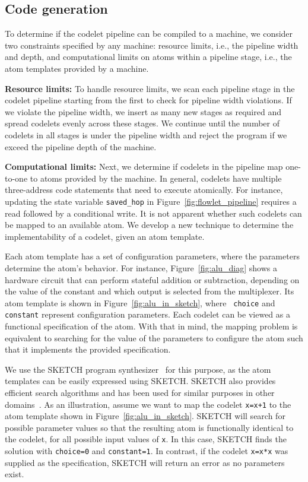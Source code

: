 \subsection{Code generation}
\label{ss:code_gen}

To determine if the codelet pipeline can be compiled to a \absmachine machine,
we consider two constraints specified by any \absmachine machine: resource
limits, i.e., the pipeline width and depth, and computational limits on atoms
within a pipeline stage, i.e., the atom templates provided by a \absmachine
machine.

\textbf{Resource limits:} To handle resource limits, we scan each pipeline
stage in the codelet pipeline starting from the first to check for pipeline
width violations.  If we violate the pipeline width, we insert as many new
stages as required and spread codelets evenly across these stages.  We continue
until the number of codelets in all stages is under the pipeline width and
reject the program if we exceed the pipeline depth of the \absmachine machine.

\textbf{Computational limits:} Next, we determine if codelets in the pipeline
map one-to-one to atoms provided by the \absmachine machine. In general,
codelets have multiple three-address code statements that need to execute
atomically. For instance, updating the state variable \texttt{saved\_hop} in
Figure~\ref{fig:flowlet_pipeline} requires a read followed by a conditional
write.  It is not apparent whether such codelets can be mapped to an available
atom. We develop a new technique to determine the implementability of a codelet,
given an atom template.

Each atom template has a set of configuration parameters, where the parameters
determine the atom's behavior.  For instance, Figure~\ref{fig:alu_diag} shows a
hardware circuit that can perform stateful addition or subtraction, depending
on the value of the constant and which output is selected from the multiplexer.
Its atom template is shown in Figure~\ref{fig:alu_in_sketch}, where {\tt
choice} and {\tt constant} represent configuration parameters.  Each codelet
can be viewed as a functional specification of the atom.  With that in mind,
the mapping problem is equivalent to searching for the value of the parameters
to configure the atom such that it implements the provided specification.

We use the SKETCH program synthesizer~\cite{sketch_asplos} for this purpose, as
the atom templates can be easily expressed using SKETCH. SKETCH also
provides efficient search algorithms and has been used for similar purposes in
other domains~\cite{bitstreaming, chlorophyll}.  As an
illustration, assume we want to map the codelet {\tt x=x+1} to the atom
template shown in Figure~\ref{fig:alu_in_sketch}. SKETCH will search for
possible parameter values so that the resulting atom is functionally identical
to the codelet, for all possible input values of {\tt x}.  In this case, SKETCH
finds the solution with {\tt choice=0} and {\tt constant=1}.  In contrast, if
the codelet {\tt x=x*x} was supplied as the specification, SKETCH will return
an error as no parameters exist.

